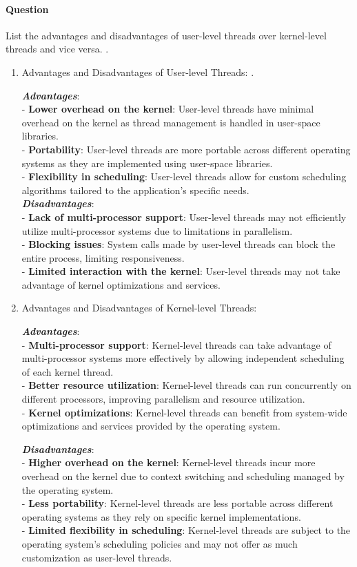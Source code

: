 \documentclass[a4paper,12pt,fleqn]{article}
\newcounter{question}
\newcommand*\question{%
\stepcounter{question}%
\paragraph{Question \thequestion}}
\begin{document}
\question 
{
	List the advantages and disadvantages of user-level threads over kernel-level threads and vice versa.
}.
\begin{enumerate}

\item{} 
{
	Advantages and Disadvantages of User-level Threads:	
}.
\begin{answer}
{
\textit{\textbf{Advantages}}:\\
- \textbf{Lower overhead on the kernel}: User-level threads have minimal overhead on the kernel as thread management is handled in user-space libraries.\\
- \textbf{Portability}: User-level threads are more portable across different operating systems as they are implemented using user-space libraries.\\
- \textbf{Flexibility in scheduling}: User-level threads allow for custom scheduling algorithms tailored to the application's specific needs.\\
\textit{\textbf{Disadvantages}}:\\
- \textbf{Lack of multi-processor support}: User-level threads may not efficiently utilize multi-processor systems due to limitations in parallelism.\\
- \textbf{Blocking issues}: System calls made by user-level threads can block the entire process, limiting responsiveness.\\
- \textbf{Limited interaction with the kernel}: User-level threads may not take advantage of kernel optimizations and services.
}
\end{answer}

\item{} 
{
Advantages and Disadvantages of Kernel-level Threads:
}
\begin{answer}
{
\textit{\textbf{Advantages}}:\\
- \textbf{Multi-processor support}: Kernel-level threads can take advantage of multi-processor systems more effectively by allowing independent scheduling of each kernel thread.\\
- \textbf{Better resource utilization}: Kernel-level threads can run concurrently on different processors, improving parallelism and resource utilization.\\
- \textbf{Kernel optimizations}: Kernel-level threads can benefit from system-wide optimizations and services provided by the operating system.

\textit{\textbf{Disadvantages}}:\\
- \textbf{Higher overhead on the kernel}: Kernel-level threads incur more overhead on the kernel due to context switching and scheduling managed by the operating system.\\
- \textbf{Less portability}: Kernel-level threads are less portable across different operating systems as they rely on specific kernel implementations.\\
- \textbf{Limited flexibility in scheduling}: Kernel-level threads are subject to the operating system's scheduling policies and may not offer as much customization as user-level threads.
}
\end{answer}

\end{enumerate}
\end{document}
